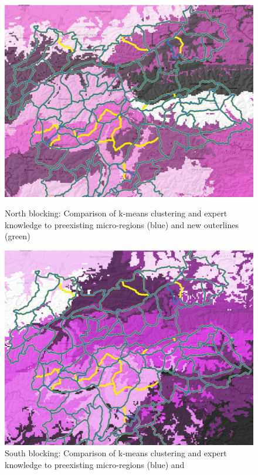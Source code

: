 \begin{figure}[ht] 
    \label{ fig7} 
    \begin{minipage}[b]{0.48\linewidth}
      \centering
      \includegraphics[width=0.9\linewidth]{Figures/figures_snowgrid/new_regions/new_regions_north_15.png} 
      \caption{North blocking: Comparison of k-means clustering and expert knowledge to preexisting micro-regions (blue) and
      new outerlines (green)} 
      \vspace{4ex}
      \hspace{4ex}
    \end{minipage}%
    \begin{minipage}[b]{0.48\linewidth}
      \centering
      \includegraphics[width=0.9\linewidth]{Figures/figures_snowgrid/new_regions/new_regions_south_15.png} 
      \caption{South blocking: Comparison of k-means clustering and expert knowledge to preexisting micro-regions (blue) and
}
\end{minipage}
\end{figure}
